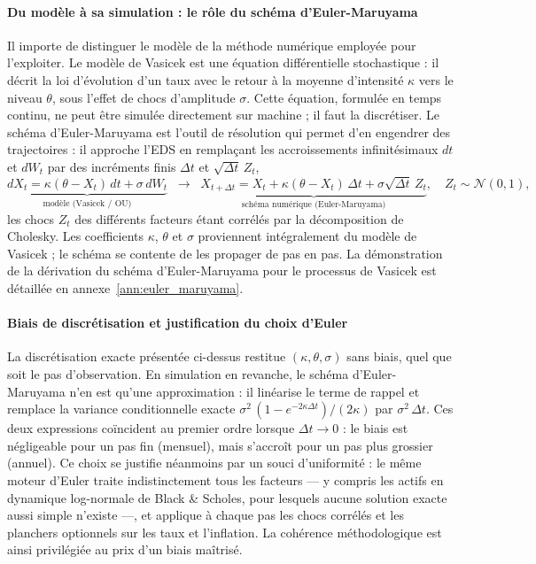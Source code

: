 \paragraph{Du modèle à sa simulation : le rôle du schéma d'Euler-Maruyama}
Il importe de distinguer le modèle de la méthode numérique employée pour l'exploiter. Le modèle de Vasicek est une équation différentielle stochastique : il décrit la loi d'évolution d'un taux avec le retour à la moyenne d'intensité $\kappa$ vers le niveau $\theta$, sous l'effet de chocs d'amplitude $\sigma$. Cette équation, formulée en temps continu, ne peut être simulée directement sur machine ; il faut la discrétiser. Le schéma d'Euler-Maruyama est l'outil de résolution qui permet d'en engendrer des trajectoires : il approche l'EDS en remplaçant les accroissements infinitésimaux $dt$ et $dW_t$ par des incréments finis $\Delta t$ et $\sqrt{\Delta t}\,Z_t$,
\[
    \underbrace{dX_t=\kappa(\theta-X_t)\,dt+\sigma\,dW_t}_{\text{modèle (Vasicek / OU)}}
    \;\;\longrightarrow\;\;
    \underbrace{X_{t+\Delta t}=X_t+\kappa(\theta-X_t)\,\Delta t+\sigma\sqrt{\Delta t}\,Z_t}_{\text{schéma numérique (Euler-Maruyama)}},
    \quad Z_t\sim\mathcal{N}(0,1),
\]
les chocs $Z_t$ des différents facteurs étant corrélés par la décomposition de Cholesky. Les coefficients $\kappa$, $\theta$ et $\sigma$ proviennent intégralement du modèle de Vasicek ; le schéma se contente de les propager de pas en pas. La démonstration de la dérivation du schéma d'Euler-Maruyama pour le processus de Vasicek est détaillée en annexe~\ref{ann:euler_maruyama}.

\paragraph{Biais de discrétisation et justification du choix d'Euler}
La discrétisation exacte présentée ci-dessus restitue $(\kappa, \theta, \sigma)$ sans biais, quel que soit le pas d'observation. En simulation en revanche, le schéma d'Euler-Maruyama n'en est qu'une approximation : il linéarise le terme de rappel et remplace la variance conditionnelle exacte $\sigma^2\,(1-e^{-2\kappa\Delta t})/(2\kappa)$ par $\sigma^2\,\Delta t$. Ces deux expressions coïncident au premier ordre lorsque $\Delta t \to 0$ : le biais est négligeable pour un pas fin (mensuel), mais s'accroît pour un pas plus grossier (annuel). Ce choix se justifie néanmoins par un souci d'uniformité : le même moteur d'Euler traite indistinctement tous les facteurs — y compris les actifs en dynamique log-normale de Black \& Scholes, pour lesquels aucune solution exacte aussi simple n'existe —, et applique à chaque pas les chocs corrélés et les planchers optionnels sur les taux et l'inflation. La cohérence méthodologique est ainsi privilégiée au prix d'un biais maîtrisé.

